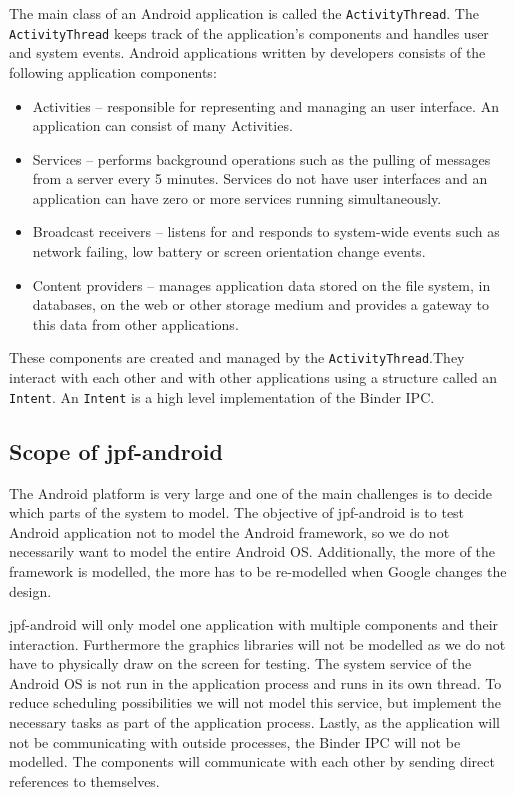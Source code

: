 \documentclass{sig-alternate}
\begin{document}
The main class of an Android application is called the \texttt{ActivityThread}. The \texttt{ActivityThread} keeps track of the
application's components and handles user and system events. Android applications written by developers consists of the
following application components:
\begin{itemize}
\item Activities -- responsible for representing and managing an user interface. An application can consist of many
Activities.
\item Services -- performs background operations such as the pulling of messages from a server every 5 minutes. Services do not have user
interfaces and an application can have zero or more services running simultaneously.
\item Broadcast receivers -- listens for and responds to system-wide events such as network failing, low battery or screen orientation
change events.
\item Content providers -- manages application data stored on the file system, in databases, on the web or other storage medium and provides
a gateway to this data from other applications.
\end{itemize}

These components are created and managed by the \texttt{ActivityThread}.They interact with each other and with other
applications using a structure called an \texttt{Intent}. An \texttt{Intent} is a high level implementation of the Binder IPC.

\subsection{Scope of jpf-android}
The Android platform is very large and one of the main challenges is to decide which parts of the system to model. The objective of
jpf-android is to test Android application not to model the Android framework, so we do not necessarily want to model the entire
Android OS. Additionally, the more of the framework is modelled, the more has to be re-modelled when Google changes the design.

jpf-android will only model one application with multiple components and their interaction. Furthermore the graphics libraries will not
be modelled as we do not have to physically draw on the screen for testing. The system service of the Android OS is not run in the
application process and runs in its own thread. To reduce scheduling possibilities we will not model this service, but implement the
necessary tasks as part of the application process. Lastly, as the application will not be communicating with outside processes, the Binder
IPC will not be modelled. The components will communicate with each other by sending direct references to themselves. 
\end{document}
